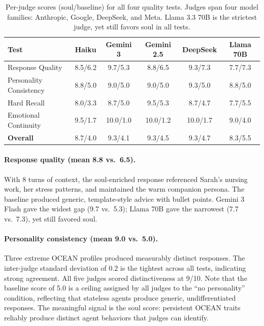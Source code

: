 \documentclass{article}
\begin{document}
\begin{table}[h]
\centering
\small
\begin{tabular}{@{}lccccc@{}}
\toprule
\textbf{Test} & \textbf{Haiku} & \textbf{Gemini 3} & \textbf{Gemini 2.5} & \textbf{DeepSeek} & \textbf{Llama 70B} \\
\midrule
Response Quality        & 8.5/6.2 & 9.7/5.3 & 8.8/6.5 & 9.3/7.3 & 7.7/7.3 \\
Personality Consistency & 8.8/5.0 & 9.0/5.0 & 9.0/5.0 & 9.3/5.0 & 8.8/5.0 \\
Hard Recall             & 8.0/3.3 & 8.7/5.0 & 9.5/5.3 & 8.7/4.7 & 7.7/5.5 \\
Emotional Continuity    & 9.5/1.7 & 10.0/1.0 & 10.0/1.2 & 10.0/1.7 & 9.0/4.0 \\
\midrule
\textbf{Overall}        & 8.7/4.0 & 9.3/4.1 & 9.3/4.5 & 9.3/4.7 & 8.3/5.5 \\
\bottomrule
\end{tabular}
\caption{Per-judge scores (soul/baseline) for all four quality tests. Judges span four model families: Anthropic, Google, DeepSeek, and Meta. Llama 3.3 70B is the strictest judge, yet still favors soul in all tests.}
\label{tab:multijudge}
\end{table}

\paragraph{Response quality (mean 8.8 vs.\ 6.5).} With 8 turns of context, the soul-enriched response referenced Sarah's nursing work, her stress patterns, and maintained the warm companion persona. The baseline produced generic, template-style advice with bullet points. Gemini 3 Flash gave the widest gap (9.7 vs.\ 5.3); Llama 70B gave the narrowest (7.7 vs.\ 7.3), yet still favored soul.

\paragraph{Personality consistency (mean 9.0 vs.\ 5.0).} Three extreme OCEAN profiles produced measurably distinct responses. The inter-judge standard deviation of 0.2 is the tightest across all tests, indicating strong agreement. All five judges scored distinctiveness at 9/10. Note that the baseline score of 5.0 is a ceiling assigned by all judges to the ``no personality'' condition, reflecting that stateless agents produce generic, undifferentiated responses. The meaningful signal is the soul score: persistent OCEAN traits reliably produce distinct agent behaviors that judges can identify.
\end{document}
